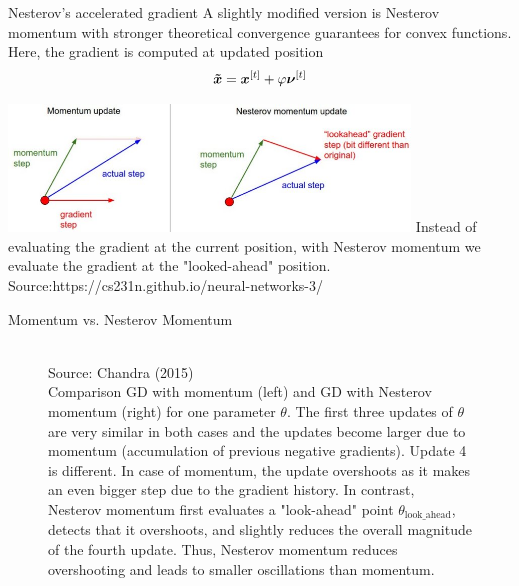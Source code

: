 \documentclass[11pt,compress,t,notes=noshow, xcolor=table]{beamer}
\begin{document}
\begin{vbframe}{Nesterov's accelerated gradient}
	A slightly modified version is Nesterov momentum with stronger theoretical convergence guarantees for convex functions. Here, the gradient is computed at updated position 
	$$
	\bm{\Tilde{x}} =  \bm{x}^{[t]} + \varphi \bm{\nu}^{[t]}
	$$
	\begin{center}
		\includegraphics[width = 0.8\textwidth]{figure_man/nesterov.jpeg}
		\footnotesize{Instead of evaluating the gradient at the current position, with Nesterov momentum we evaluate the gradient at the "looked-ahead" position. \\ Source:https://cs231n.github.io/neural-networks-3/}
	\end{center}
\end{vbframe}

\begin{vbframe}{Momentum vs. Nesterov Momentum}
	\begin{figure}
		\vspace{-0.3cm}
		
		\centering
		\tiny{\\Source: Chandra (2015) \\}
		\footnotesize{Comparison GD with momentum (left) and GD with Nesterov momentum (right) for one parameter $\theta$. The first three updates of $\theta$ are very similar in both cases and the updates become larger due to momentum (accumulation of previous negative gradients). Update 4 is different. In case of momentum, the update overshoots as it makes an even bigger step due to the gradient history. In contrast, Nesterov momentum first evaluates a "look-ahead" point $\theta_{\text{look\_ahead}}$, detects that it overshoots, and slightly reduces the overall magnitude of the fourth update. Thus, Nesterov momentum reduces overshooting and leads to smaller oscillations than momentum. }
	\end{figure}
\end{vbframe}



\endlecture
\end{document}
